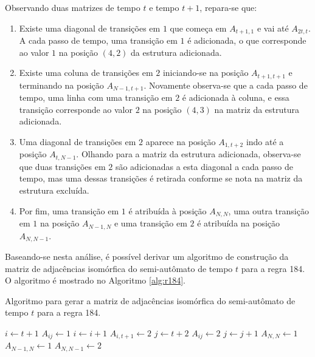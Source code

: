 \documentclass[12pt,a4paper]{article}
\begin{document}
Observando duas matrizes de tempo $t$ e tempo $t+1$, repara-se que:

\begin{enumerate}
\item Existe uma diagonal de transições em $1$ que começa em $A_{t+1,1}$
e vai até $A_{2t,t}$. A cada passo de tempo, uma transição em $1$ é adicionada,
o que corresponde ao valor $1$ na posição $(4,2)$ da estrutura adicionada.

\item Existe uma coluna de transições em $2$ iniciando-se na posição
$A_{t+1,t+1}$ e terminando na posição $A_{N-1,t+1}$. Novamente observa-se
que a cada passo de tempo, uma linha com uma transição em $2$ é adicionada à
coluna, e essa transição corresponde ao valor $2$ na posição $(4,3)$ na matriz da
estrutura adicionada.

\item Uma diagonal de transições em $2$ aparece na posição $A_{1,t+2}$ indo
até a posição $A_{t,N-1}$. Olhando para a matriz da estrutura adicionada,
observa-se que duas transições em $2$ são adicionadas a esta diagonal a cada
passo de tempo, mas uma dessas transições é retirada conforme se nota na
matriz da estrutura excluída.

\item Por fim, uma transição em $1$ é atribuída à posição $A_{N,N}$, uma
outra transição em $1$ na posição $A_{N-1,N}$ e uma transição em $2$ é
atribuída na posição $A_{N,N-1}$.
\end{enumerate}

Baseando-se nesta análise, é possível derivar um algoritmo de construção da
matriz de adjacências isomórfica do semi-autômato de tempo $t$ para a
regra 184. O algoritmo é mostrado no Algoritmo \ref{alg:r184}.

\begin{algorithm}
\caption{Algoritmo para gerar a matriz de adjacências isomórfica do
semi-autômato de tempo $t$ para a regra 184.}
\label{alg:r184}
\begin{algorithmic}
\STATE $i \leftarrow t+1$
\STATE $A_{ij} \leftarrow 1$
\STATE $i \leftarrow i+1$
\ENDFOR
{}
\STATE $A_{i,t+1} \leftarrow 2$
\ENDFOR
\STATE $j \leftarrow t+2$
\STATE $A_{ij} \leftarrow 2$
\STATE $j \leftarrow j+1$
\ENDFOR
\STATE $A_{N,N} \leftarrow 1$
\STATE $A_{N-1,N} \leftarrow 1$
\STATE $A_{N,N-1} \leftarrow 2$
\end{algorithmic}
\end{algorithm}
\end{document}

